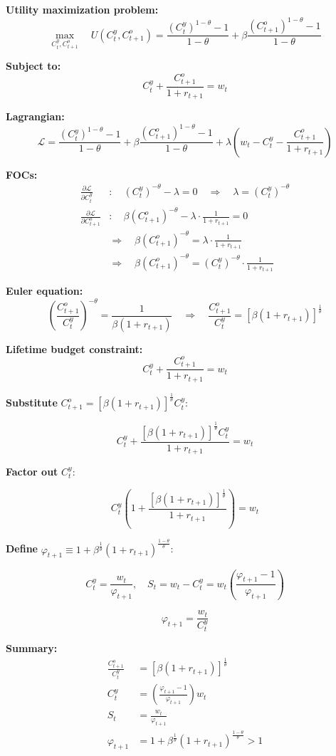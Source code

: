 \documentclass[12pt]{article}
\begin{document}
{\color{blue}
\textbf{Utility maximization problem:}
\[
\max_{C_t^y, C_{t+1}^o} \quad U(C_t^y, C_{t+1}^o) = \frac{(C_t^y)^{1 - \theta} - 1}{1 - \theta} + \beta \frac{(C_{t+1}^o)^{1 - \theta} - 1}{1 - \theta}
\]

\textbf{Subject to:}
\[
C_t^y + \frac{C_{t+1}^o}{1 + r_{t+1}} = w_t
\]

\textbf{Lagrangian:}
\[
\mathcal{L} = \frac{(C_t^y)^{1 - \theta} - 1}{1 - \theta} + \beta \frac{(C_{t+1}^o)^{1 - \theta} - 1}{1 - \theta} + \lambda \left( w_t - C_t^y - \frac{C_{t+1}^o}{1 + r_{t+1}} \right)
\]

\textbf{FOCs:}
\begin{align*}
\frac{\partial \mathcal{L}}{\partial C_t^y} &: \quad (C_t^y)^{-\theta} - \lambda = 0 \quad \Rightarrow \quad \lambda = (C_t^y)^{-\theta} \\
\frac{\partial \mathcal{L}}{\partial C_{t+1}^o} &: \quad \beta (C_{t+1}^o)^{-\theta} - \lambda \cdot \frac{1}{1 + r_{t+1}} = 0 \\
&\Rightarrow \quad \beta (C_{t+1}^o)^{-\theta} = \lambda \cdot \frac{1}{1 + r_{t+1}} \\
&\Rightarrow \quad \beta (C_{t+1}^o)^{-\theta} = (C_t^y)^{-\theta} \cdot \frac{1}{1 + r_{t+1}}
\end{align*}

\textbf{Euler equation:}
\[
\left( \frac{C_{t+1}^o}{C_t^y} \right)^{-\theta} = \frac{1}{\beta (1 + r_{t+1})} \quad \Rightarrow \quad \frac{C_{t+1}^o}{C_t^y} = [\beta (1 + r_{t+1})]^{\frac{1}{\theta}}
\]

\textbf{Lifetime budget constraint:}
\[
C_t^y + \frac{C_{t+1}^o}{1 + r_{t+1}} = w_t
\]

\textbf{Substitute } \( C_{t+1}^o = \left[ \beta (1 + r_{t+1}) \right]^{\frac{1}{\theta}} C_t^y \):

\[
C_t^y + \frac{ \left[ \beta (1 + r_{t+1}) \right]^{\frac{1}{\theta}} C_t^y }{1 + r_{t+1}} = w_t
\]

\textbf{Factor out } \( C_t^y \):

\[
C_t^y \left( 1 + \frac{ \left[ \beta (1 + r_{t+1}) \right]^{\frac{1}{\theta}} }{1 + r_{t+1}} \right) = w_t
\]

\textbf{Define } \( \varphi_{t+1} \equiv 1 + \beta^{\frac{1}{\theta}} (1 + r_{t+1})^{\frac{1 - \theta}{\theta}} \):

\[
C_t^y = \frac{w_t}{\varphi_{t+1}}, \quad S_t = w_t - C_t^y = w_t \left( \frac{\varphi_{t+1} - 1}{\varphi_{t+1}} \right)
\]

\[
\varphi_{t+1} = \frac{w_t}{C_t^y}
\]


\textbf{Summary:}
\begin{align*}
\frac{C_{t+1}^o}{C_t^y} &= [\beta(1 + r_{t+1})]^{\frac{1}{\theta}} \\
C_t^y &= \left( \frac{\varphi_{t+1} - 1}{\varphi_{t+1}} \right) w_t \\
S_t &= \frac{w_t}{\varphi_{t+1}} \\
\varphi_{t+1} &= 1 + \beta^{\frac{1}{\theta}} (1 + r_{t+1})^{\frac{1 - \theta}{\theta}} > 1
\end{align*}
}
\end{document}
